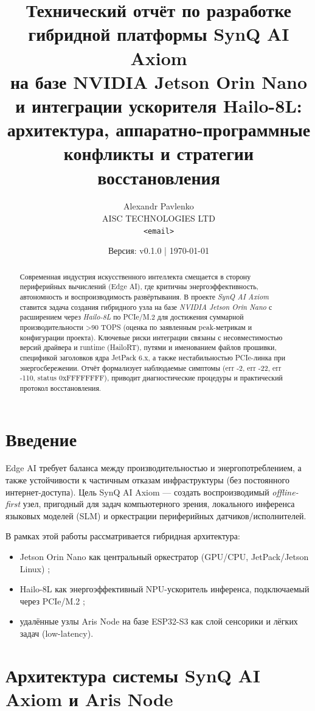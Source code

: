 \documentclass[11pt,a4paper]{article}
\title{
  \textbf{Технический отчёт по разработке гибридной платформы SynQ AI Axiom}\\
  \large на базе NVIDIA Jetson Orin Nano и интеграции ускорителя Hailo-8L:\\
  \large архитектура, аппаратно-программные конфликты и стратегии восстановления
}
\author{
  Alexandr Pavlenko\\
  AISC TECHNOLOGIES LTD\\
  \texttt{<email>}\\
}
\date{Версия: v0.1.0 \quad | \quad \today}
\begin{document}
\maketitle

\begin{abstract}
Современная индустрия искусственного интеллекта смещается в сторону периферийных вычислений (Edge AI), где критичны энергоэффективность, автономность и воспроизводимость развёртывания. В проекте \textit{SynQ AI Axiom} ставится задача создания гибридного узла на базе \textit{NVIDIA Jetson Orin Nano} с расширением через \textit{Hailo-8L} по PCIe/M.2 для достижения суммарной производительности \textgreater 90 TOPS (оценка по заявленным peak-метрикам и конфигурации проекта).
Ключевые риски интеграции связаны с несовместимостью версий драйвера и runtime (HailoRT), путями и именованием файлов прошивки, спецификой заголовков ядра JetPack 6.x, а также нестабильностью PCIe-линка при энергосбережении.
Отчёт формализует наблюдаемые симптомы (err -2, err -22, err -110, status 0xFFFFFFFF), приводит диагностические процедуры и практический протокол восстановления.
\end{abstract}

\section{Введение}
Edge AI требует баланса между производительностью и энергопотреблением, а также устойчивости к частичным отказам инфраструктуры (без постоянного интернет-доступа). Цель SynQ AI Axiom — создать воспроизводимый \textit{offline-first} узел, пригодный для задач компьютерного зрения, локального инференса языковых моделей (SLM) и оркестрации периферийных датчиков/исполнителей.

В рамках этой работы рассматривается гибридная архитектура:
\begin{itemize}[leftmargin=1.2em]
  \item Jetson Orin Nano как центральный оркестратор (GPU/CPU, JetPack/Jetson Linux) \citep{nvidia_jetson_linux_docs};
  \item Hailo-8L как энергоэффективный NPU-ускоритель инференса, подключаемый через PCIe/M.2 \citep{hailo_8l_page};
  \item удалённые узлы Aris Node на базе ESP32-S3 как слой сенсорики и лёгких задач (low-latency).
\end{itemize}

\section{Архитектура системы SynQ AI Axiom и Aris Node}
\end{document}
